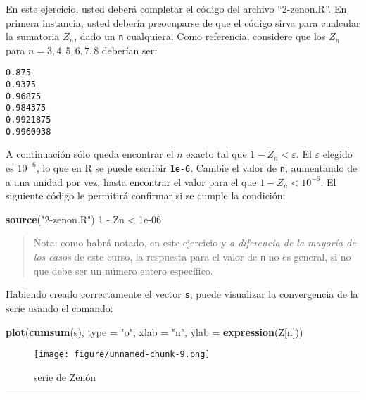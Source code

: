 \documentclass[]{article}
\makeatletter
\newenvironment{Shaded}{}{}
\newcommand{\KeywordTok}[1]{\textcolor[rgb]{0.00,0.44,0.13}{\textbf{{#1}}}}
\newcommand{\DataTypeTok}[1]{\textcolor[rgb]{0.56,0.13,0.00}{{#1}}}
\newcommand{\DecValTok}[1]{\textcolor[rgb]{0.25,0.63,0.44}{{#1}}}
\newcommand{\FloatTok}[1]{\textcolor[rgb]{0.25,0.63,0.44}{{#1}}}
\newcommand{\StringTok}[1]{\textcolor[rgb]{0.25,0.44,0.63}{{#1}}}
\newcommand{\NormalTok}[1]{{#1}}
\def\maxwidth{\ifdim\Gin@nat@width>\linewidth\linewidth
\else\Gin@nat@width\fi}
\let\Oldincludegraphics\includegraphics
\renewcommand{\includegraphics}[1]{\Oldincludegraphics[width=\maxwidth]{#1}}
\makeatother
\begin{document}
En este ejercicio, usted deberá completar el código del archivo
``2-zenon.R''. En primera instancia, usted debería preocuparse de que el
código sirva para cualcular la sumatoria $Z_n$, dado un \texttt{n}
cualquiera. Como referencia, considere que los $Z_n$ para
$n = 3, 4, 5, 6, 7, 8$ deberían ser:

\begin{verbatim}
0.875
0.9375
0.96875
0.984375
0.9921875
0.9960938
\end{verbatim}
A continuación sólo queda encontrar el $n$ exacto tal que
$1 - Z_n < \varepsilon$. El $\varepsilon$ elegido es $10^{-6}$, lo que
en R se puede escribir \texttt{1e-6}. Cambie el valor de \texttt{n},
aumentando de a una unidad por vez, hasta encontrar el valor para el que
$1 - Z_n < 10^{-6}$. El siguiente código le permitirá confirmar si se
cumple la condición:

\begin{Shaded}
\begin{Highlighting}[]
\KeywordTok{source}\NormalTok{(}\StringTok{"2-zenon.R"}\NormalTok{)}
\DecValTok{1} \NormalTok{- Zn < }\FloatTok{1e-06}
\end{Highlighting}
\end{Shaded}
\begin{quote}
Nota: como habrá notado, en este ejercicio y \emph{a diferencia de la
mayoría de los casos} de este curso, la respuesta para el valor de
\texttt{n} no es general, si no que debe ser un número entero
específico.

\end{quote}
Habiendo creado correctamente el vector \texttt{s}, puede visualizar la
convergencia de la serie usando el comando:

\begin{Shaded}
\begin{Highlighting}[]
\KeywordTok{plot}\NormalTok{(}\KeywordTok{cumsum}\NormalTok{(s), }\DataTypeTok{type =} \StringTok{"o"}\NormalTok{, }\DataTypeTok{xlab =} \StringTok{"n"}\NormalTok{, }\DataTypeTok{ylab =} \KeywordTok{expression}\NormalTok{(Z[n]))}
\end{Highlighting}
\end{Shaded}
\begin{figure}[htbp]
\centering
\texttt{[image: figure/unnamed-chunk-9.png]}
\caption{serie de Zenón}
\end{figure}

\begin{center}\rule{3in}{0.4pt}\end{center}
\end{document}
